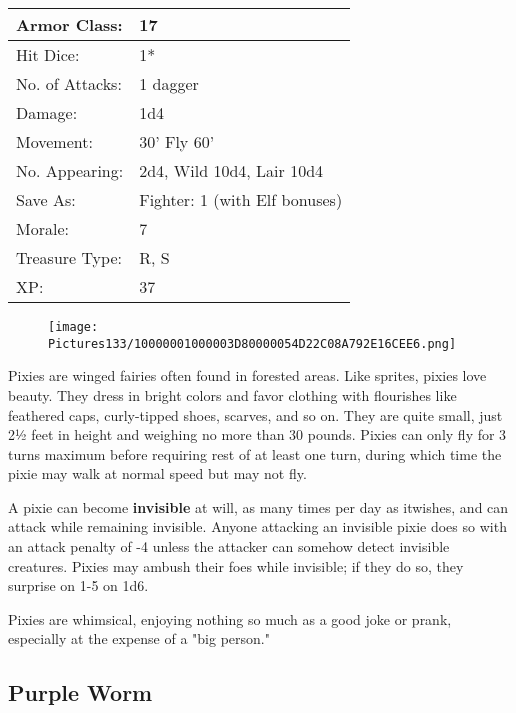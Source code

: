 \documentclass[a4paper,twoside,openany,10pt]{book}
\begin{document}
\begin{multicols}{2}
\begin{tabularx}{0.50\textwidth}{@{}lX@{}}
Armor Class: & 17 \\\hline
Hit Dice: & 1* \\\hline
No. of Attacks: & 1 dagger \\\hline
Damage: & 1d4 \\\hline
Movement: & 30' Fly 60' \\\hline
No. Appearing: & 2d4, Wild 10d4, Lair 10d4 \\\hline
Save As: & Fighter: 1 (with Elf bonuses) \\\hline
Morale: & 7 \\\hline
Treasure Type: & R, S \\\hline
XP: & 37 \\\hline
\end{tabularx}\medskip

\begin{wrapfigure}{l}{0.25\textwidth}
 \texttt{[image: Pictures133/10000001000003D80000054D22C08A792E16CEE6.png]} 
\end{wrapfigure}

Pixies are winged fairies often found in forested areas. Like sprites, pixies love beauty. They dress in bright colors and favor clothing with flourishes like feathered caps, curly-tipped shoes, scarves, and so on. They are quite small, just 2½ feet in height and weighing no more than 30 pounds. Pixies can only fly for 3 turns maximum before requiring rest of at least one turn, during which time the pixie may walk at normal speed but may not fly.

A pixie can become \textbf{invisible }at will, as many times per day as itwishes, and can attack while remaining invisible. Anyone attacking an invisible pixie does so with an attack penalty of -4 unless the attacker can somehow detect invisible creatures. Pixies may ambush their foes while invisible; if they do so, they surprise on 1-5 on 1d6. 

Pixies are whimsical, enjoying nothing so much as a good joke or prank, especially at the expense of a "big person."

\subsection*{Purple Worm}\label{purple-worm}


\end{multicols}
\end{document}
